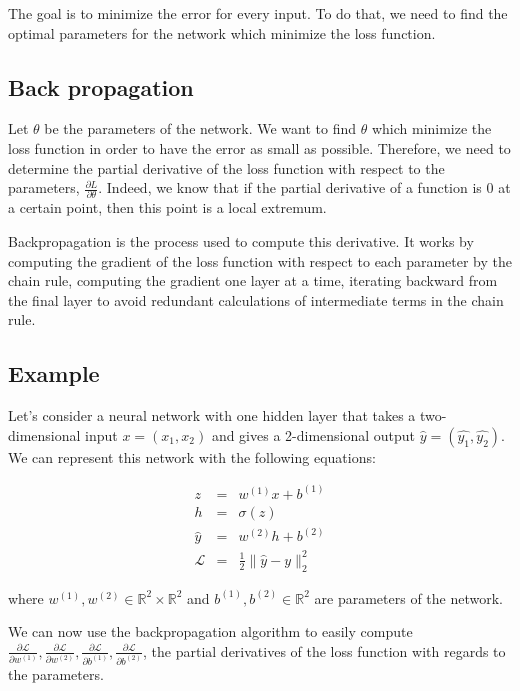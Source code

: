 \documentclass[10pt,a4paper]{article}
\theoremstyle{definition}
\theoremstyle{definition}
\theoremstyle{definition}
\begin{document}
The goal is to minimize the error for every input. To do that, we need to find the optimal parameters for the network which minimize the loss function.



\subsection{Back propagation}
Let $\theta$ be the parameters of the network. We want to find $\theta$ which minimize the loss function in order to have the error as small as possible. Therefore, we need to determine the partial derivative of the loss function with respect to the parameters, $\frac{\partial L}{\partial \theta}$. Indeed, we know that if the partial derivative of a function is $0$ at a certain point, then this point is a local extremum. 

Backpropagation \cite{11} is the process used to compute this derivative. It works by computing the gradient of the loss function with respect to each parameter by the chain rule, computing the gradient one layer at a time, iterating backward from the final layer to avoid redundant calculations of intermediate terms in the chain rule.

\subsection{Example} \label{exnn}
Let's consider a neural network with one hidden layer that takes a two-dimensional input $x = (x_1, x_2)$ and gives a 2-dimensional output $\hat{y} = (\hat{y_1},\hat{y_2})$. We can represent this network with the following equations:

\begin{eqnarray*}
z & = & w^{(1)}x + b^{(1)} \\ 
h & = & \sigma (z)\\
\hat{y} & = &  w^{(2)}h + b^{(2)} \\
\mathcal{L} & = & \frac{1}{2} \| \hat{y} - y \|_2^2
\end{eqnarray*}
   
where $w^{(1)}, w^{(2)} \in \mathbb{R}^2\times \mathbb{R}^2$ and $b^{(1)}, b^{(2)} \in \mathbb{R}^2$ are parameters of the network.

We can now use the backpropagation algorithm to easily compute $\frac{\partial \mathcal{L}}{\partial w^{(1)}}, \frac{\partial \mathcal{L}}{\partial w^{(2)}},\frac{\partial \mathcal{L}}{\partial b^{(1)}},\frac{\partial \mathcal{L}}{\partial b^{(2)}}$, the partial derivatives of the loss function with regards to the parameters.
\end{document}
